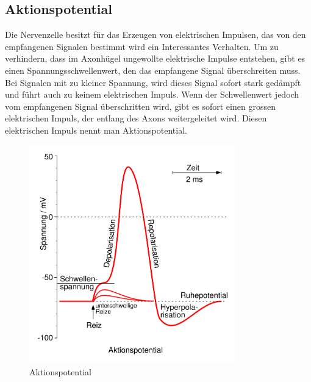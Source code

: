 \begin{refsection}
\subsection{Aktionspotential}
Die Nervenzelle besitzt für das Erzeugen von elektrischen Impulsen, das von den empfangenen Signalen bestimmt wird ein Interessantes Verhalten.
Um zu verhindern, dass im Axonhügel ungewollte elektrische Impulse entstehen, gibt es einen Spannungsschwellenwert,
den das empfangene Signal überschreiten muss.
Bei Signalen mit zu kleiner Spannung, wird dieses Signal sofort stark gedämpft und führt auch zu keinem elektrischen Impuls.
Wenn der Schwellenwert jedoch vom empfangenen Signal überschritten wird, gibt es sofort einen grossen elektrischen Impuls,
der entlang des Axons weitergeleitet wird. 
Diesen elektrischen Impuls nennt man Aktionspotential.
\begin{figure}[h]
    \centering
    \includegraphics[width=0.8\textwidth]{papers/nerven/Bilder/Aktionspotential.png}
    \caption{Aktionspotential \cite{nerven:JohnEcclesAlanHodgkinAndrewHuxley.}}
    \label{fig:Aktionspotential}
\end{figure}


\end{refsection}

